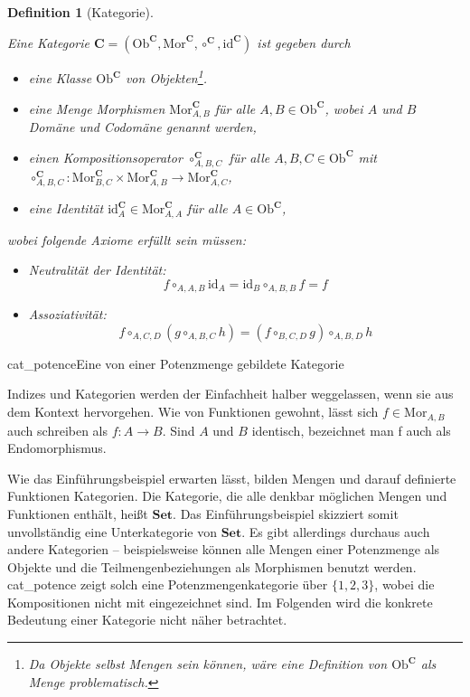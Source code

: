 \documentclass[12pt, a4paper, bibgerm]{scrbook}
\newcommand\abb{}
\newcommand\fig{}
\newcommand\ato{\rightarrow} %
\newtheorem{defini}{Definition}
\newcommand{\defi}[2]{%
  \begin{defini}[#1]
    \label{def:#1}
    #2
  \end{defini}
}
\begin{document}
\defi{Kategorie}{
Eine Kategorie $\mathbf{C} = (\mathrm{Ob}^\mathbf{C}, \mathrm{Mor}^\mathbf{C},
\circ^\mathbf{C}, \mathrm{id}^\mathbf{C})$ ist gegeben durch
\begin{itemize}
\item eine Klasse $\mathrm{Ob}^\mathbf{C}$ von Objekten\footnote{Da Objekte selbst Mengen
    sein können, wäre eine Definition von $\mathrm{Ob}^\mathbf{C}$ als Menge problematisch.}.
\item eine Menge Morphismen $\mathrm{Mor}^\mathbf{C}_{A,B}$ für alle $ A,B \in
  \mathrm{Ob}^\mathbf{C}$, wobei $A$ und $B$ Domäne und Codomäne genannt werden,
\item einen Kompositionsoperator $\circ^\mathbf{C}_{A,B,C}$ für alle $
  A,B,C \in \mathrm{Ob}^\mathbf{C}$ mit \\
  $\circ^\mathbf{C}_{A,B,C} : \mathrm{Mor}^\mathbf{C}_{B,C} \times
  \mathrm{Mor}^\mathbf{C}_{A,B} \rightarrow \mathrm{Mor}^\mathbf{C}_{A,C}$,
\item eine Identität $\mathrm{id}^\mathbf{C}_A \in \mathrm{Mor}^\mathbf{C}_{A,A}$ für alle $ A \in \mathrm{Ob}^\mathbf{C}$,
\end{itemize}
wobei folgende Axiome erfüllt sein müssen:
\begin{itemize}
\item Neutralität der Identität: $$f \circ_{A,A,B} \mathrm{id}_A = \mathrm{id}_B \circ_{A,B,B} f = f$$
\item Assoziativität:
  $$f \circ_{A,C,D} (g \circ_{A,B,C} h) = (f \circ_{B,C,D} g) \circ_{A,B,D}h$$
\end{itemize}
}

\fig{cat_potence}{Eine von einer Potenzmenge gebildete Kategorie}

Indizes und Kategorien werden der Einfachheit halber weggelassen, wenn
sie aus dem Kontext hervorgehen. Wie von Funktionen gewohnt, lässt sich
$f \in \mathrm{Mor}_{A,B}$ auch schreiben als $f : A \ato B$. Sind $A$
und $B$ identisch, bezeichnet man f auch als Endomorphismus.

Wie das Einführungsbeispiel erwarten lässt, bilden Mengen und darauf
definierte Funktionen Kategorien. Die Kategorie, die alle denkbar
möglichen Mengen und Funktionen enthält, heißt $\mathbf{Set}$. Das
Einführungsbeispiel skizziert somit unvollständig eine Unterkategorie
von $\mathbf{Set}$. Es gibt allerdings durchaus auch andere Kategorien --
beispielsweise können alle Mengen einer Potenzmenge als Objekte und die
Teilmengenbeziehungen als Morphismen benutzt werden. \abb{cat_potence}
zeigt solch eine Potenzmengenkategorie über $\{1,2,3\}$, wobei die
Kompositionen nicht mit eingezeichnet sind. Im Folgenden wird die
konkrete Bedeutung einer Kategorie nicht näher betrachtet.
\end{document}
